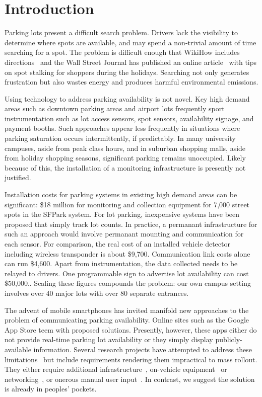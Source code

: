 \section{Introduction}


Parking lots present a difficult search problem. Drivers lack the visibility
to determine where spots are available, and may spend a non-trivial amount of
time searching for a spot. The problem is difficult enough that WikiHow
includes directions~\cite{wikihow-park} and the Wall Street Journal has
published an online article~\cite{wsj-park} with tips on spot stalking for
shoppers during the holidays. Searching not only generates frustration but
also wastes energy and produces harmful environmental emissions.

Using technology to address parking availability is not novel.  Key high
demand areas such as downtown parking areas and airport lots frequently sport
instrumentation such as lot access sensors, spot sensors, availability
signage, and payment booths.  Such approaches appear less frequently  in
situations where parking saturation occurs intermittently, if predictably.
In many university campuses, aside from peak class hours, and in suburban
shopping malls, aside from holiday shopping seasons, significant parking
remains unoccupied.  Likely because of this, the installation of a monitoring
infrastructure is presently not justified.

Installation costs for parking systems in existing high demand areas can be
significant:  \$18 million for monitoring and collection equipment for 7,000
street spots in the SFPark system.\cite{sf-park}  For lot parking, inexpensive
systems have been proposed that simply track lot counts.\cite{lot-count}  In
practice, a permanant infrastructure for such an approach would involve
permanant mounting and communication for each sensor.  For comparison, the
real cost of an installed vehicle detector including wireless transponder is
about \$9,700.\cite{car-detect}  Communication link costs alone can run
\$4,600.\cite{mstp-park}  Apart from instrumentation, the data collected
needs to be relayed to drivers.  One programmable sign to advertise lot
availability can cost \$50,000.\cite{mstp-park}.  Scaling these figures
compounds the problem:  our own campus setting involves over 40 major lots
with over 80 separate entrances.

The advent of mobile smartphones has invited manifold new approaches to the
problem of communicating parking availability.  Online sites such as the
Google App Store teem with proposed solutions.  Presently, however, these
apps either do not provide real-time parking lot availability or they simply
display publicly-available information. Several research projects have
attempted to address these limitations~\cite{4212497, Chen:2012:COS,
Delot:2009:CRP, 5062057, Mathur:2010:PDS} but include requirements rendering
them impractical to mass rollout.  They either require additional
infrastructure~\cite{5062057}, on-vehicle equipment~\cite{Mathur:2010:PDS}
or networking~\cite{Delot:2009:CRP, Mathur:2010:PDS}, or onerous manual user
input~\cite{Chen:2012:COS}. In contrast, we suggest the solution is already
in peoples' pockets.

